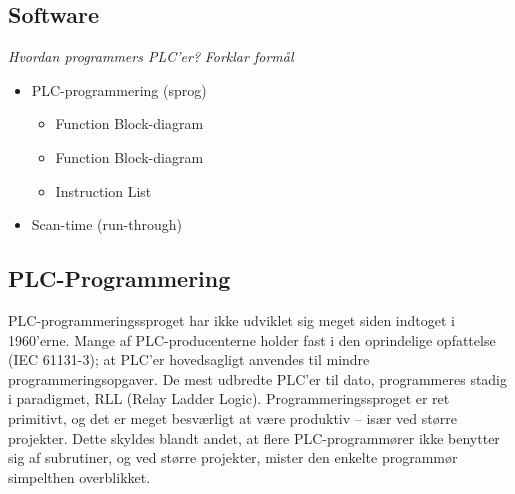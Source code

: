 



\subsection{Software}
\textit{Hvordan programmers PLC'er?}
\textit{Forklar formål}
\begin{itemize}
    \item PLC-programmering (sprog)
    \begin{itemize}
        \item Function Block-diagram
        \item Function Block-diagram
        \item Instruction List
    \end{itemize}
    \item Scan-time (run-through)
\end{itemize}




\subsection{PLC-Programmering}
PLC-programmeringssproget har ikke udviklet sig meget siden indtoget i 1960’erne. Mange af PLC-producenterne holder fast i den oprindelige opfattelse (IEC 61131-3); at PLC’er hovedsagligt anvendes til mindre programmeringsopgaver. De mest udbredte PLC’er til dato, programmeres stadig i paradigmet, RLL (Relay Ladder Logic). Programmeringssproget er ret primitivt, og det er meget besværligt at være produktiv – især ved større projekter. Dette skyldes blandt andet, at flere PLC-programmører ikke benytter sig af subrutiner, og ved større projekter, mister den enkelte programmør simpelthen overblikket. 

